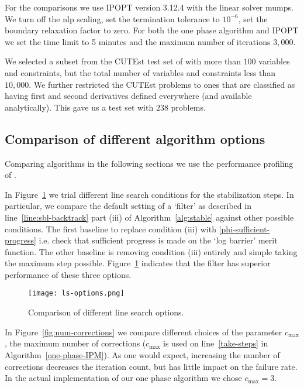 \documentclass{article}
\begin{document}
For the comparisons we use IPOPT version 3.12.4 with the linear solver mumps. We turn off the nlp scaling, set the termination tolerance to $10^{-6}$, set the boundary relaxation factor to zero. For both the one phase algorithm and IPOPT we set the time limit to 5 minutes and the maximum number of iterations $3,000$.

We selected a subset from the CUTEst test set of with more than $100$ variables and constraints, but the total number of variables and constraints less than $10,000$. We further restricted the CUTEst problems to ones that are classified as having first and second derivatives defined everywhere (and available analytically). This gave us a test set with $238$ problems.

\subsection{Comparison of different algorithm options}\label{alg:comparison-options}

Comparing algorithms in the following sections we use the performance profiling of \cite{dolan2002benchmarking}.



In Figure~\ref{fig:ls-options} we trial different line search conditions for the stabilization steps. In particular, we compare the default setting of a `filter' as described in line~\eqref{line:sbl-backtrack} part (iii) of Algorithm~\ref{alg:stable} against other possible conditions. The first baseline to replace condition (iii) with  \eqref{phi-sufficient-progress} i.e. check that sufficient progress is made on the `log barrier' merit function. The other baseline is removing condition (iii) entirely and simple taking the maximum step possible. Figure~\ref{fig:ls-options} indicates that the filter has superior performance of these three options.

\begin{figure}[H]
\texttt{[image: ls-options.png]}
\caption{Comparison of different line search options.}\label{fig:ls-options}
\end{figure}

In Figure~\ref{fig:num-corrections} we compare different choices of the parameter $c_{\max}$, the maximum number of corrections ($c_{\max}$ is used on line~\ref{take-steps} in Algorithm~\ref{one-phase-IPM}). As one would expect, increasing the number of corrections decreases the iteration count, but has little impact on the failure rate. In the actual implementation of our one phase algorithm we chose $c_{\max}=3$.
\end{document}

